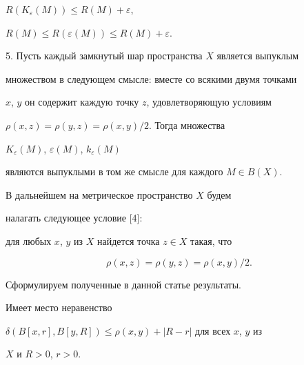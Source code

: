 $R(K_{\varepsilon}(M)) \leq R(M) + \varepsilon $, 


$R(M) \leq R(\varepsilon (M)) \leq R(M) + \varepsilon $.





5. Пусть каждый замкнутый шар пространства $X$ является выпуклым 


множеством в следующем смысле: вместе со всякими двумя точками


$x$, $y$ он содержит каждую точку $z$, удовлетворяющую условиям


$\rho (x,z) = \rho (y,z) = \rho (x,y)/2$. Тогда множества


$K_{\varepsilon}(M)$, $\varepsilon (M)$, $k_{\varepsilon}(M)$


являются выпуклыми в том же смысле для каждого $M \in B(X)$.





В дальнейшем на метрическое пространство $X$ будем 


налагать следующее условие [4]:


для любых $x$, $y$ из $X$ найдется точка $z \in X$ такая, что 


\begin{equation}


\rho (x,z) = \rho (y,z) = \rho (x,y)/2.


\end{equation}





Сформулируем полученные в данной статье результаты. 





\begin{lem}


Имеет место неравенство 


$\delta (B[x,r],B[y,R]) \leq \rho (x,y) + |R - r|$ для всех $x$, $y$ из 


$X$ и $R >0$, $r > 0$.


\end{lem}





